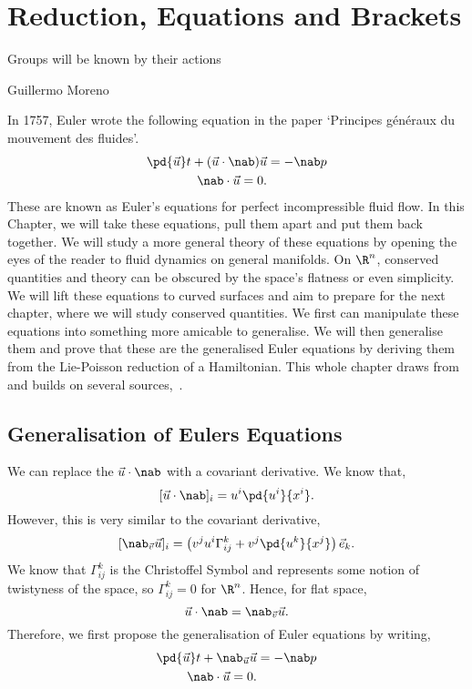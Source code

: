 
\chapter{Reduction, Equations and Brackets}
\epigraph{Groups will be known by their actions}{Guillermo Moreno}

\noindent
In 1757, Euler wrote the following equation in the paper `Principes g\'en\'eraux du mouvement des fluides'.
\begin{align*}
  \pd {\vec u} t + ({\vec u} \cdot\nab){\vec u} &= - \nab p\\
  \nab \cdot {\vec u} = 0.
\end{align*}
These are known as Euler's equations for perfect incompressible fluid flow. In this Chapter, we will take these equations, pull them apart and put them back together. We will study a more general theory of these equations by opening the eyes of the reader to fluid dynamics on general manifolds. On $\R^n$, conserved quantities and theory can be obscured by the space's flatness or even simplicity. We will lift these equations to curved surfaces and aim to prepare for the next chapter, where we will study conserved quantities. We first can manipulate these equations into something more amicable to generalise. We will then generalise them and prove that these are the generalised Euler equations by deriving them from the Lie-Poisson reduction of a Hamiltonian. This whole chapter draws from and builds on several sources,~\cite{tmih,holm,arthur,holm1998eulerpoincare,gary_fluids,gaybalmaz2009geometric,Kolev_2007,diffeost,shkoller2000incompressible,marsden1999geometry,vasylkevych2007liepoisson}.

\section{Generalisation of Eulers Equations}
\noindent
We can replace the $\vec u \cdot \nab$ with a covariant derivative. We know that,
$$ [\vec u \cdot \nab]_i = u^i \pd {u^i} {x^i}. $$
However, this is very similar to the covariant derivative,
$$ [\nab_{\vec v}\vec u]_i = \left(v^ju^i\Gamma_{ij}^k + v^j \pd {u^k}{x^j}\right)\vec e_k. $$
We know that $\Gamma_{ij}^k$ is the Christoffel Symbol and represents some notion of twistyness of the space, so $\Gamma_{ij}^k = 0$ for $\R^n$. Hence, for flat space,
$$ \vec u \cdot \nab = \nab_{\vec v}\vec u. $$
Therefore, we first propose the generalisation of Euler equations by writing,
\begin{equation}
  \begin{split}
    \pd {\vec u} t + \nab_{\vec u}{\vec u} &= - \nab p\\
    \nab \cdot {\vec u} = 0.
  \end{split}
  \label{eq:CVDEulerEqns}
\end{equation}

